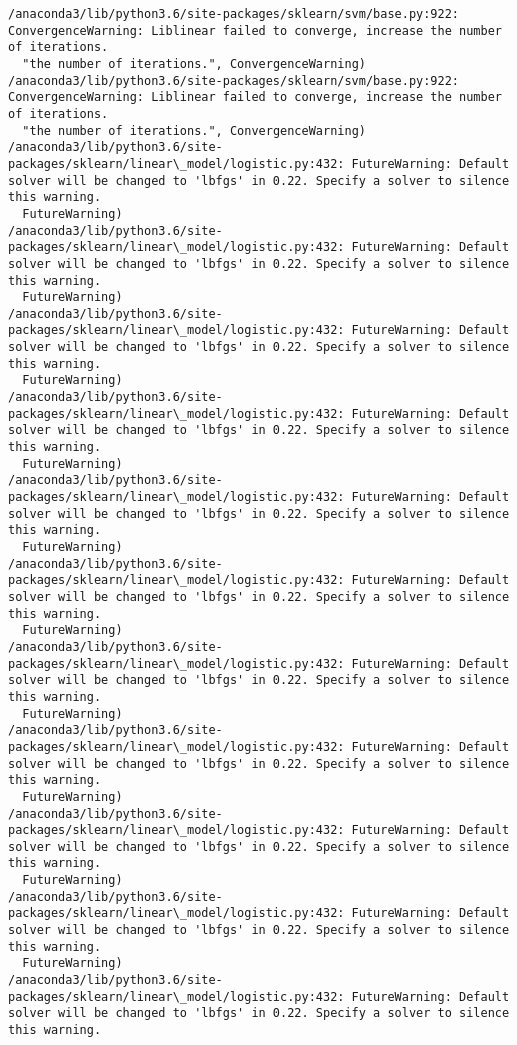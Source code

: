 \documentclass[11pt]{article}
\begin{document}
\begin{Verbatim}[commandchars=\\\{\}]
/anaconda3/lib/python3.6/site-packages/sklearn/svm/base.py:922: ConvergenceWarning: Liblinear failed to converge, increase the number of iterations.
  "the number of iterations.", ConvergenceWarning)
/anaconda3/lib/python3.6/site-packages/sklearn/svm/base.py:922: ConvergenceWarning: Liblinear failed to converge, increase the number of iterations.
  "the number of iterations.", ConvergenceWarning)
/anaconda3/lib/python3.6/site-packages/sklearn/linear\_model/logistic.py:432: FutureWarning: Default solver will be changed to 'lbfgs' in 0.22. Specify a solver to silence this warning.
  FutureWarning)
/anaconda3/lib/python3.6/site-packages/sklearn/linear\_model/logistic.py:432: FutureWarning: Default solver will be changed to 'lbfgs' in 0.22. Specify a solver to silence this warning.
  FutureWarning)
/anaconda3/lib/python3.6/site-packages/sklearn/linear\_model/logistic.py:432: FutureWarning: Default solver will be changed to 'lbfgs' in 0.22. Specify a solver to silence this warning.
  FutureWarning)
/anaconda3/lib/python3.6/site-packages/sklearn/linear\_model/logistic.py:432: FutureWarning: Default solver will be changed to 'lbfgs' in 0.22. Specify a solver to silence this warning.
  FutureWarning)
/anaconda3/lib/python3.6/site-packages/sklearn/linear\_model/logistic.py:432: FutureWarning: Default solver will be changed to 'lbfgs' in 0.22. Specify a solver to silence this warning.
  FutureWarning)
/anaconda3/lib/python3.6/site-packages/sklearn/linear\_model/logistic.py:432: FutureWarning: Default solver will be changed to 'lbfgs' in 0.22. Specify a solver to silence this warning.
  FutureWarning)
/anaconda3/lib/python3.6/site-packages/sklearn/linear\_model/logistic.py:432: FutureWarning: Default solver will be changed to 'lbfgs' in 0.22. Specify a solver to silence this warning.
  FutureWarning)
/anaconda3/lib/python3.6/site-packages/sklearn/linear\_model/logistic.py:432: FutureWarning: Default solver will be changed to 'lbfgs' in 0.22. Specify a solver to silence this warning.
  FutureWarning)
/anaconda3/lib/python3.6/site-packages/sklearn/linear\_model/logistic.py:432: FutureWarning: Default solver will be changed to 'lbfgs' in 0.22. Specify a solver to silence this warning.
  FutureWarning)
/anaconda3/lib/python3.6/site-packages/sklearn/linear\_model/logistic.py:432: FutureWarning: Default solver will be changed to 'lbfgs' in 0.22. Specify a solver to silence this warning.
  FutureWarning)
/anaconda3/lib/python3.6/site-packages/sklearn/linear\_model/logistic.py:432: FutureWarning: Default solver will be changed to 'lbfgs' in 0.22. Specify a solver to silence this warning.

\end{Verbatim}
\end{document}
